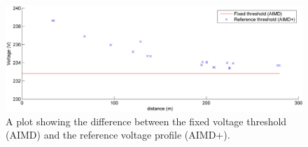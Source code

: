 \begin{figure}[htb]\centering
 \includegraphics{_chapter1/fig/input/ref-voltage-plot}
 \caption{A plot showing the difference between the fixed voltage threshold (AIMD) and the reference voltage profile (AIMD+).}
 \label{ch1:fig:ref-voltage-plot}
\end{figure}
